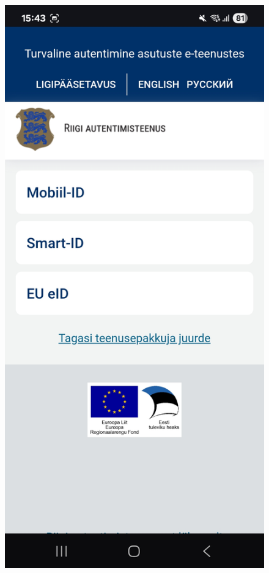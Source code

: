 \begin{figure}[H]
\begin{minipage}{0.32\textwidth}
\end{minipage}%
\hfill
\begin{minipage}{0.32\textwidth}
    \centering
    \includegraphics[width=\textwidth]{english/figures/Screenshot_20250810_154342_Data Access Notifier.jpg}

\end{minipage}
\end{figure}
